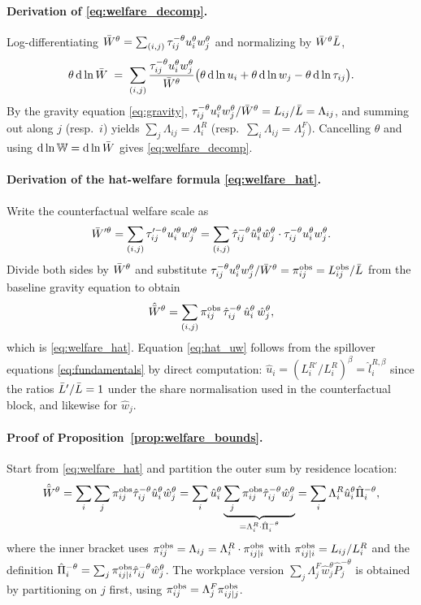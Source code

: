 \paragraph{Derivation of \eqref{eq:welfare_decomp}.}
Log-differentiating $\bar W^{\theta}=\sum_{(i,j)}\tau_{ij}^{-\theta}
u_i^{\theta}w_j^{\theta}$ and normalizing by $\bar W^{\theta}\bar L$,
\[
  \theta\,\mathrm d\ln\bar W
  \;=\;\sum_{(i,j)}\frac{\tau_{ij}^{-\theta}u_i^{\theta}w_j^{\theta}}{\bar W^{\theta}}
       \bigl(\theta\,\mathrm d\ln u_i+\theta\,\mathrm d\ln w_j
        -\theta\,\mathrm d\ln\tau_{ij}\bigr).
\]
By the gravity equation \eqref{eq:gravity},
$\tau_{ij}^{-\theta}u_i^{\theta}w_j^{\theta}/\bar W^{\theta}
=L_{ij}/\bar L=\Lambda_{ij}$, and summing out along $j$ (resp.\ $i$)
yields $\sum_j\Lambda_{ij}=\Lambda_i^R$ (resp.\
$\sum_i\Lambda_{ij}=\Lambda_j^F$).  Cancelling $\theta$ and using
$\mathrm d\ln\mathbb W=\mathrm d\ln\bar W$ gives
\eqref{eq:welfare_decomp}.

\paragraph{Derivation of the hat-welfare formula
\eqref{eq:welfare_hat}.}
Write the counterfactual welfare scale as
\[
  \bar W'^{\theta}
  =\sum_{(i,j)}\tau_{ij}'^{-\theta}u_i'^{\theta}w_j'^{\theta}
  =\sum_{(i,j)}\hat{\tau}_{ij}^{-\theta}\hat u_i^{\theta}\hat w_j^{\theta}
   \cdot\tau_{ij}^{-\theta}u_i^{\theta}w_j^{\theta}.
\]
Divide both sides by $\bar W^{\theta}$ and substitute
$\tau_{ij}^{-\theta}u_i^{\theta}w_j^{\theta}/\bar W^{\theta}=\pi_{ij}^{\mathrm{obs}}
=L_{ij}^{\mathrm{obs}}/\bar L$ from the baseline gravity equation to obtain
\[
  \hat{\bar W}^{\theta}
  =\sum_{(i,j)}\pi_{ij}^{\mathrm{obs}}\,\hat{\tau}_{ij}^{-\theta}
   \,\hat u_i^{\theta}\,\hat w_j^{\theta},
\]
which is \eqref{eq:welfare_hat}.  Equation \eqref{eq:hat_uw} follows
from the spillover equations \eqref{eq:fundamentals} by direct
computation: $\hat u_i=(L_i^{R\prime}/L_i^R)^{\beta}=\hat
l_i^{R,\beta}$ since the ratios
$\bar L'/\bar L=1$ under the share normalisation used in the
counterfactual block, and likewise for $\hat w_j$.

\paragraph{Proof of Proposition~\ref{prop:welfare_bounds}.}
Start from \eqref{eq:welfare_hat} and partition the outer sum by
residence location:
\[
  \hat{\bar W}^{\theta}
  =\sum_{i}\sum_{j}\pi_{ij}^{\mathrm{obs}}\hat{\tau}_{ij}^{-\theta}
   \hat u_i^{\theta}\hat w_j^{\theta}
  =\sum_{i}\hat u_i^{\theta}\underbrace{\sum_{j}\pi_{ij}^{\mathrm{obs}}
   \hat{\tau}_{ij}^{-\theta}\hat w_j^{\theta}}_{=\Lambda_i^R\cdot
   \hat\Pi_i^{-\theta}}
  =\sum_{i}\Lambda_i^R\hat u_i^{\theta}\hat\Pi_i^{-\theta},
\]
where the inner bracket uses
$\pi_{ij}^{\mathrm{obs}}=\Lambda_{ij}=\Lambda_i^R\cdot\pi_{ij|i}^{\mathrm{obs}}$ with
$\pi_{ij|i}^{\mathrm{obs}}=L_{ij}/L_i^R$ and the definition
$\hat\Pi_i^{-\theta}=\sum_j\pi_{ij|i}^{\mathrm{obs}}\hat{\tau}_{ij}^{-\theta}
\hat w_j^{\theta}$.  The workplace version
$\sum_j\Lambda_j^F\hat w_j^{\theta}\hat P_j^{-\theta}$ is obtained by
partitioning on $j$ first, using
$\pi_{ij}^{\mathrm{obs}}=\Lambda_j^F\pi_{ij|j}^{\mathrm{obs}}$.


